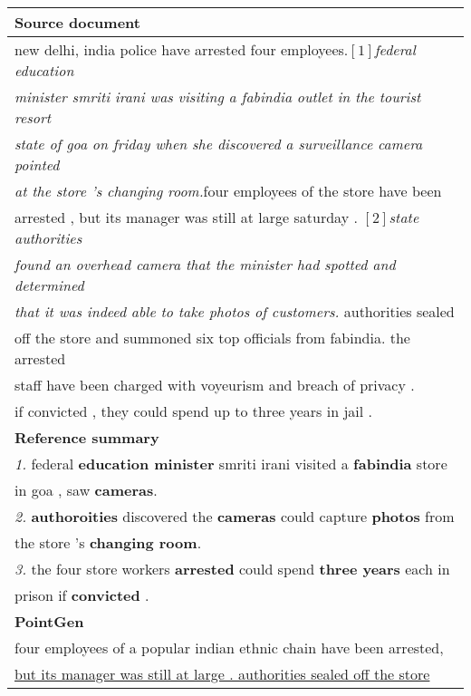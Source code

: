 \begin{table}[th]
\begin{center}
\scriptsize
\begin{tabular}{|l|}%
\hline \bf Source document \\
\hline new delhi, india police have arrested four employees.\textit{$[1]$federal education} \\
       \textit{minister smriti irani was visiting a fabindia outlet in the tourist resort} \\
	   \textit{state of goa on friday when she discovered a surveillance camera pointed} \\
	   \textit{at the store 's changing room.}four employees of the store have been \\
	   arrested , but its manager was still at large saturday . \textit{$[2]$state authorities} \\
	   \textit{found an overhead camera that the minister had spotted and determined} \\
	   \textit{that it was indeed able to take photos of customers.} authorities sealed \\
	   off the store and summoned six top officials from fabindia. the arrested \\
	   staff have been charged with voyeurism and breach of privacy . \\
	   if convicted , they could spend up to three years in jail . \\
\hline \bf Reference summary \\
\hline \textit{1.} federal \textbf{education minister} smriti irani visited a \textbf{fabindia} store \\ 
       in goa , saw \textbf{cameras}. \\
	   \textit{2.} \textbf{authoroities} discovered the \textbf{cameras} could capture \textbf{photos} 
	   from \\
	   the store 's \textbf{changing room}. \\
	   \textit{3.} the four store workers \textbf{arrested} could spend \textbf{three years} each in \\
	   prison if \textbf{convicted} . \\
\hline \bf PointGen \cite{SeeLM17} \\
\hline four employees of a popular indian ethnic chain have been arrested, \\
       \underline{but its manager was still at large . authorities sealed off the store} \\

\end{tabular}
\end{center}
\end{table}
